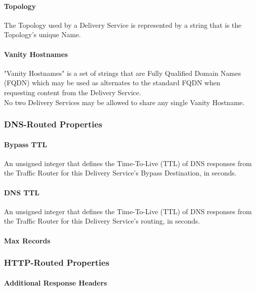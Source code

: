 \paragraph{Topology}
The Topology used by a Delivery Service is represented by a string that is the
Topology's unique Name.

\paragraph{Vanity Hostnames}
"Vanity Hostnames" is a set of strings that are Fully Qualified Domain Names
(FQDN) which may be used as alternates to the standard
 FQDN when requesting
content from the Delivery Service.\\
No two Delivery Services may be allowed to share any single Vanity Hostname.

\subsubsection{DNS-Routed Properties}

\paragraph{Bypass TTL}
An unsigned integer that defines the Time-To-Live (TTL) of DNS responses from
the Traffic Router for this Delivery Service's Bypass Destination, in seconds.

\paragraph{DNS TTL}
An unsigned integer that defines the Time-To-Live (TTL) of DNS responses from
the Traffic Router for this Delivery Service's routing, in seconds.

\paragraph{Max Records}

\subsubsection{HTTP-Routed Properties}

\paragraph{Additional Response Headers}

